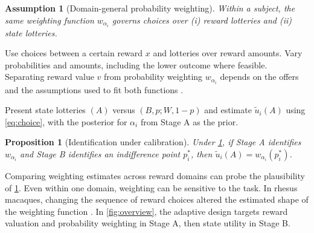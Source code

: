 \documentclass[11pt,a4paper]{article}
\newtheorem{assumption}{Assumption}
\newtheorem{proposition}{Proposition}
\begin{document}
\begin{assumption}[Domain-general probability weighting]
\label{ass:domain}
Within a subject, the same weighting function $w_{\alpha_i}$ governs choices over (i) reward lotteries and (ii) state lotteries.
\end{assumption}

\begin{description}[leftmargin=*]
  \item[Stage A (risk calibration).] Use choices between a certain reward $x$ and lotteries over reward amounts. Vary probabilities and amounts, including the lower outcome where feasible. Separating reward value $v$ from probability weighting $w_{\alpha_i}$ depends on the offers and the assumptions used to fit both functions \citep{wakker2008,stauffer2015}.
  \item[Stage B (state valuation).] Present state lotteries $(A)$ versus $(B,p;W,1-p)$ and estimate $\tilde u_i(A)$ using \cref{eq:choice}, with the posterior for $\alpha_i$ from Stage A as the prior.
\end{description}

\begin{proposition}[Identification under calibration]
\label{prop:id}
Under \cref{ass:domain}, if Stage A identifies $w_{\alpha_i}$ and Stage B identifies an indifference point $p^\ast_i$, then $\tilde u_i(A)=w_{\alpha_i}(p^\ast_i)$.
\end{proposition}

Comparing weighting estimates across reward domains can probe the plausibility of \cref{ass:domain}. Even within one domain, weighting can be sensitive to the task. In rhesus macaques, changing the sequence of reward choices altered the estimated shape of the weighting function \citep{ferraritoniolo2019}. In \cref{fig:overview}, the adaptive design targets reward valuation and probability weighting in Stage A, then state utility in Stage B.
\end{document}
